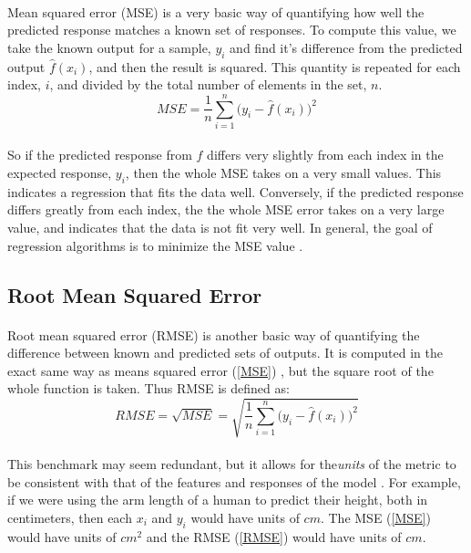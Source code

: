 \documentclass[12pt,letterpaper]{article}
\begin{document}
\paragraph*{}Mean squared error (MSE) is a very basic way of quantifying how well the predicted response matches a known set of responses. To compute this value, we take the known output for a sample, $y_i$ and find it's difference from the predicted output $\hat{f}(x_i)$, and then the result is squared. This quantity is repeated for each index, $i$, and divided by the total number of elements in the set, $n$.
\begin{equation}
\label{MSE}
MSE = \frac{1}{n}\sum_{i=1}^{n} \Big( y_i - \hat{f}(x_i) \Big)^2
\end{equation}
\paragraph*{}So if the predicted response from $\hat{f}$ differs very slightly from each index in the expected response, $y_i$, then the whole MSE takes on a very small values. This indicates a regression that fits the data well. Conversely, if the predicted response differs greatly from each index, the the whole MSE error takes on a very large value, and indicates that the data is not fit very well. In general, the goal of regression algorithms is to minimize the MSE value \cite{Petrik}.


\subsection{Root Mean Squared Error}
\paragraph*{}Root mean squared error (RMSE) is another basic way of quantifying the difference between known and predicted sets of outputs. It is computed in the exact same way as means squared error (\ref{MSE}) , but the square root of the whole function is taken. Thus RMSE is defined as:
\begin{equation}
\label{RMSE}
RMSE = \sqrt{MSE} = 
\sqrt{\frac{1}{n}\sum_{i=1}^{n} \Big( y_i - \hat{f}(x_i) \Big)^2}
\end{equation}
\paragraph*{}This benchmark may seem redundant, but it allows for the\textit{units} of the metric to be consistent with that of the features and responses of the model \cite{Petrik}. For example, if we were using the arm length of a human to predict their height, both in centimeters, then each $x_i$ and $y_i$ would have units of $cm$. The MSE (\ref{MSE}) would have units of $cm^2$ and the RMSE (\ref{RMSE}) would have units of $cm$.
\end{document}
